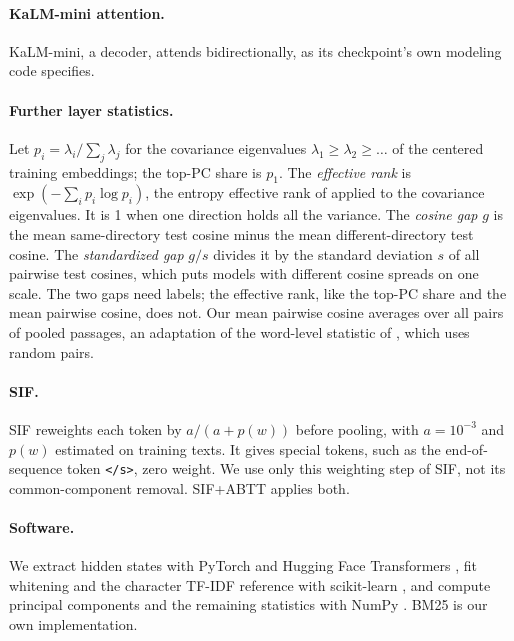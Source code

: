 \documentclass[11pt]{article}
\begin{document}
\paragraph{KaLM-mini attention.}
KaLM-mini, a decoder, attends bidirectionally, as its checkpoint's own modeling code specifies.

\paragraph{Further layer statistics.}
Let $p_i = \lambda_i / \sum_j \lambda_j$ for the covariance eigenvalues $\lambda_1 \geq \lambda_2 \geq \dots$ of the centered training embeddings; the top-PC share is $p_1$.
The \emph{effective rank} is $\exp(-\sum_i p_i \log p_i)$, the entropy effective rank of \citet{roy2007effectiverank} applied to the covariance eigenvalues.
It is 1 when one direction holds all the variance.
The \emph{cosine gap} $g$ is the mean same-directory test cosine minus the mean different-directory test cosine.
The \emph{standardized gap} $g/s$ divides it by the standard deviation $s$ of all pairwise test cosines, which puts models with different cosine spreads on one scale.
The two gaps need labels; the effective rank, like the top-PC share and the mean pairwise cosine, does not.
Our mean pairwise cosine averages over all pairs of pooled passages, an adaptation of the word-level statistic of \citet{ethayarajh2019contextual}, which uses random pairs.

\paragraph{SIF.}
SIF \citep{arora2017sif} reweights each token by $a/(a+p(w))$ before pooling, with $a=10^{-3}$ and $p(w)$ estimated on training texts.
It gives special tokens, such as the end-of-sequence token \texttt{</s>}, zero weight.
We use only this weighting step of SIF, not its common-component removal.
SIF+ABTT applies both.

\paragraph{Software.}
We extract hidden states with PyTorch \citep{paszke2019pytorch} and Hugging Face Transformers \citep{wolf2020transformers}, fit whitening and the character TF-IDF reference with scikit-learn \citep{pedregosa2011scikit}, and compute principal components and the remaining statistics with NumPy \citep{harris2020numpy}.
BM25 is our own implementation.
\end{document}

